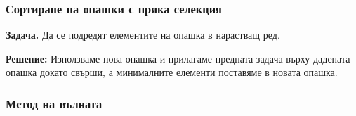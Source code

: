\documentclass[alsotrans]{beamerswitch}
\begin{document}
\begin{frame}
  \frametitle{Сортиране на опашки с пряка селекция}

\textbf{Задача.} Да се подредят елементите на опашка в нарастващ ред.
\vspace{1em}
\pause

\textbf{Решение:} Използваме нова опашка и прилагаме предната задача върху дадената опашка докато свърши, а минималните елементи поставяме в новата опашка.
\end{frame}

\begin{frame}
  \frametitle{Метод на вълната}

  \scriptsize
  \begin{center}
\end{center}
\end{frame}
\end{document}
